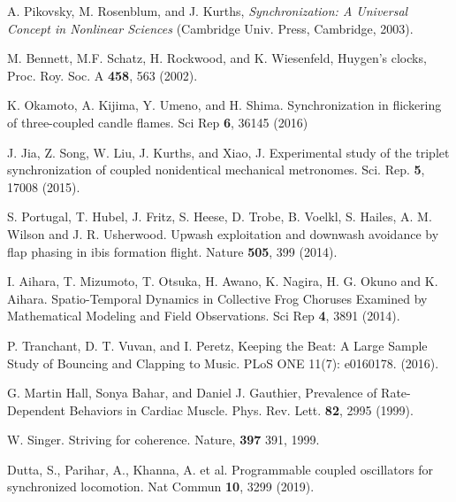 \documentclass[twocolumn,preprintnumbers,amsmath,amssymb,aps,prx]{revtex4}
\begin{document}
\begin{thebibliography}{99}

  
 A. Pikovsky, M. Rosenblum, and J. Kurths, {\it Synchronization: A Universal Concept in Nonlinear Sciences} (Cambridge Univ. Press, Cambridge, 2003).
  
 M. Bennett, M.F. Schatz, H. Rockwood, and K. Wiesenfeld, Huygen's clocks, Proc. Roy. Soc. A {\bf 458}, 563 (2002).
  
 K. Okamoto, A. Kijima, Y. Umeno, and H. Shima. Synchronization in flickering of three-coupled candle flames. Sci Rep {\bf 6}, 36145 (2016)

  J. Jia, Z. Song, W. Liu, J. Kurths, and Xiao, J. Experimental study of the triplet synchronization of coupled nonidentical mechanical metronomes. Sci. Rep. {\bf 5}, 17008 (2015).

  
 S. Portugal, T. Hubel, J. Fritz, S. Heese, D. Trobe, B. Voelkl, S. Hailes, A. M. Wilson and J. R. Usherwood.  Upwash exploitation and downwash avoidance by flap phasing in ibis formation flight. Nature {\bf 505}, 399 (2014).

   I. Aihara, T. Mizumoto, T. Otsuka, H. Awano, K. Nagira, H. G. Okuno and K. Aihara. Spatio-Temporal Dynamics in Collective Frog Choruses Examined by Mathematical Modeling and Field Observations. Sci Rep {\bf 4}, 3891 (2014). 

   P. Tranchant, D. T. Vuvan, and I. Peretz, Keeping the Beat: A Large Sample Study of Bouncing and Clapping to Music. PLoS ONE 11(7): e0160178. (2016).

   G. Martin Hall, Sonya Bahar, and Daniel J. Gauthier, Prevalence of Rate-Dependent Behaviors in Cardiac Muscle. Phys. Rev. Lett. {\bf 82}, 2995 (1999).

   W. Singer. Striving for coherence. Nature, {\bf 397} 391, 1999.

     Dutta, S., Parihar, A., Khanna, A. et al. Programmable coupled oscillators for synchronized locomotion. Nat Commun {\bf 10}, 3299 (2019).
    

\end{thebibliography}
\end{document}
